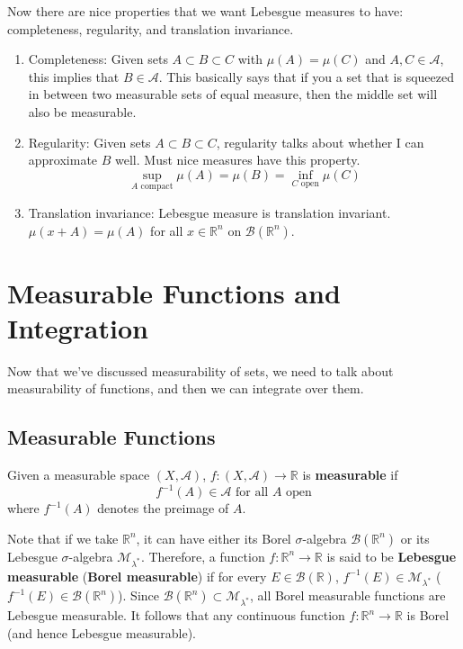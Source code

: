 \documentclass{article}
\begin{document}
Now there are nice properties that we want Lebesgue measures to have: completeness, regularity, and translation invariance. 
\begin{enumerate}
  \item Completeness: Given sets $A \subset B \subset C$ with $\mu(A) = \mu(C)$ and $A, C \in \mathcal{A}$, this implies that $B \in \mathcal{A}$. This basically says that if you a set that is squeezed in between two measurable sets of equal measure, then the middle set will also be measurable. 
  \item Regularity: Given sets $A \subset B \subset C$, regularity talks about whether I can approximate $B$ well. Must nice measures have this property. 
  \[\sup_{A \text{ compact}} \mu(A) = \mu(B) = \inf_{C \text{ open}} \mu(C)\]
  \item Translation invariance: Lebesgue measure is translation invariant. $\mu(x + A) = \mu(A)$ for all $x \in \mathbb{R}^n$ on $\mathcal{B}(\mathbb{R}^n)$. 
\end{enumerate}

\section{Measurable Functions and Integration}

Now that we've discussed measurability of sets, we need to talk about measurability of functions, and then we can integrate over them.  

\subsection{Measurable Functions}

\begin{definition}
  Given a measurable space $(X, \mathcal{A})$, $f: (X, \mathcal{A}) \longrightarrow \mathbb{R}$ is \textbf{measurable} if 
  \[f^{-1}(A) \in \mathcal{A} \text{ for all } A \text{ open}\]
  where $f^{-1}(A)$ denotes the preimage of $A$. 
\end{definition}

Note that if we take $\mathbb{R}^n$, it can have either its Borel $\sigma$-algebra $\mathcal{B}(\mathbb{R}^n)$ or its Lebesgue $\sigma$-algebra $\mathcal{M}_{\lambda^*}$. Therefore, a function $f: \mathbb{R}^n \longrightarrow \mathbb{R}$ is said to be \textbf{Lebesgue measurable} (\textbf{Borel measurable}) if for every $E \in \mathcal{B}(\mathbb{R})$, $f^{-1}(E) \in \mathcal{M}_{\lambda^*}$ ($f^{-1}(E) \in \mathcal{B}(\mathbb{R}^n)$). Since $\mathcal{B}(\mathbb{R}^n) \subset \mathcal{M}_{\lambda^*}$, all Borel measurable functions are Lebesgue measurable. It follows that any continuous function $f: \mathbb{R}^n \longrightarrow \mathbb{R}$ is Borel (and hence Lebesgue measurable). 
\end{document}
